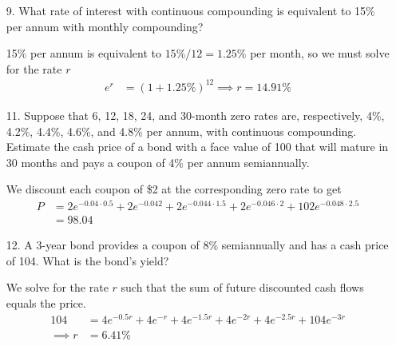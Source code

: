 \documentclass{article}
\begin{document}
\begin{itemize}
	\item[9.] What rate of interest with continuous compounding is equivalent to 15\% per annum with monthly compounding?
		\begin{soln}
			15\% per annum is equivalent to $15\%/12=1.25\%$ per month, so we must solve for the rate $r$
			\begin{align*}
				e^r &= (1+1.25\%)^{12} \implies r = 14.91\%
			\end{align*}
		\end{soln}

	\item[11.] Suppose that 6, 12, 18, 24, and 30-month zero rates are, respectively, 4\%, 4.2\%, 4.4\%, 4.6\%, and 4.8\% per annum, with continuous compounding. Estimate the cash price of a bond with a face value of 100 that will mature in 30 months and pays a coupon of 4\% per annum semiannually.
		\begin{soln}
			We discount each coupon of \$2 at the corresponding zero rate to get
			\begin{align*}
				P &= 2e^{-0.04\cdot 0.5} + 2e^{-0.042} + 2e^{-0.044\cdot 1.5} + 2e^{-0.046\cdot 2} + 102e^{-0.048\cdot 2.5} \\
				&= 98.04
			\end{align*}
		\end{soln}

	\item[12.] A 3-year bond provides a coupon of 8\% semiannually and has a cash price of 104. What is the bond's yield?
		\begin{soln}
			We solve for the rate $r$ such that the sum of future discounted cash flows equals the price.
			\begin{align*}
				104 &= 4e^{-0.5r} + 4e^{-r} + 4e^{-1.5r} + 4e^{-2r} + 4e^{-2.5r} + 104e^{-3r} \\
				\implies r &= 6.41\%
			\end{align*}
		\end{soln}


\end{itemize}
\end{document}
